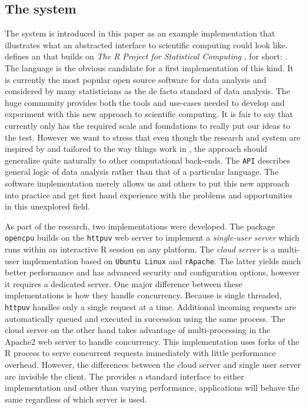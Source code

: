 \subsection{The \OpenCPU system}

The \OpenCPU system is introduced in this paper as an example implementation that illustrates what an abstracted interface to scientific computing could look like. \OpenCPU defines an \HTTP \API that builds on \emph{The R Project for Statistical Computing} \citep{R}, for short: \R. The \R language is the obvious candidate for a first implementation of this kind. It is currently the most popular open source software for data analysis and considered by many statisticians as the de facto standard of data analysis. The huge \R community provides both the tools and use-cases needed to develop and experiment with this new approach to scientific computing. It is fair to say that currently only \R has the required scale and foundations to really put our ideas to the test. However we want to stress that even though the research and \OpenCPU system are inspired by and tailored to the way things work in \R, the approach should generalize quite naturally to other computational back-ends. The \texttt{API} describes general logic of data analysis rather than that of a particular language. The software implementation merely allows us and others to put this new approach into practice and get first hand experience with the problems and opportunities in this unexplored field.


As part of the research, two implementations were developed. The \R package \texttt{opencpu} builds on the \texttt{httpuv} web server \citep{httpuv} to implement a \emph{single-user server} which runs within an interactive R session on any platform. The \emph{cloud server} is a multi-user implementation based on \texttt{Ubuntu Linux} and \texttt{rApache}. The latter yields much better performance and has advanced security and configuration options, however it requires a dedicated \Linux server. One major difference between these implementations is how they handle concurrency. Because \R is single threaded, \texttt{httpuv} handles only a single request at a time. Additional incoming requests are automatically queued and executed in succession using the same process. The cloud server on the other hand takes advantage of multi-processing in the Apache2 web server to handle concurrency. This implementation uses forks of the R process to serve concurrent requests immediately with little performance overhead. However, the differences between the cloud server and single user server are invisible the client. The \API provides a standard interface to either implementation and other than varying performance, applications will behave the same regardless of which server is used. 

